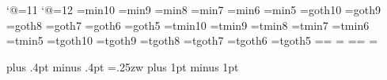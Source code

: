 %
%

\catcode`@=11 %
\def\footnote#1{\let\@sf\empty %
  \ifhmode\edef\@sf{\spacefactor\the\spacefactor}\/\fi
  \nobreak#1\@sf\vfootnote{#1}}
\catcode`@=12 %
%
\font\tenmin=min10 %
\font\preloaded=min9
\font\preloaded=min8
\font\sevenmin=min7
\font\preloaded=min6
\font\fivemin=min5
%
\font\tengt=goth10 %
\font\preloaded=goth9
\font\preloaded=goth8
\font\sevengt=goth7
\font\preloaded=goth6
\font\fivegt=goth5
%
\font\tentmin=tmin10 %
\font\preloaded=tmin9
\font\preloaded=tmin8
\font\seventmin=tmin7
\font\preloaded=tmin6
\font\fivetmin=tmin5
%
\font\tentgt=tgoth10 %
\font\preloaded=tgoth9
\font\preloaded=tgoth8
\font\seventgt=tgoth7
\font\preloaded=tgoth6
\font\fivetgt=tgoth5
%
\newfam\minfam %
\newfam\gtfam  %
%
\def\mc{\fam\minfam\tenmin}%
\textfont\minfam=\tenmin\scriptfont\minfam=\sevenmin%
\scriptscriptfont\minfam=\fivemin
%
\def\gt{\fam\gtfam\tengt}%
\textfont\gtfam=\tengt\scriptfont\gtfam=\sevengt%
\scriptscriptfont\gtfam=\fivegt
%

\mc		  %
\kanjiskip=0pt plus .4pt minus .4pt
\xkanjiskip=.25zw plus 1pt minus 1pt
\autospacing\autoxspacing
{}
%
\def\fmtname{ptex}
\def\fmtversion{3.14159 p1.0b}
